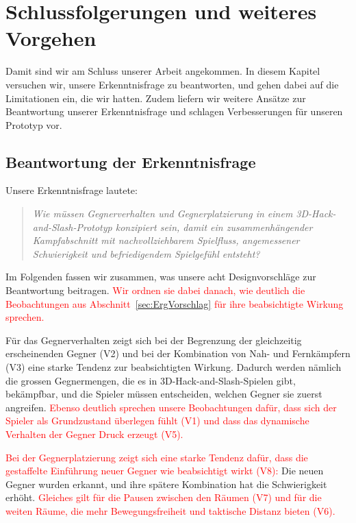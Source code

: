 \documentclass[../Main.tex]{subfiles}
\begin{document}
\section{Schlussfolgerungen und weiteres Vorgehen} \label{sec:Schlussfolgerungen}

Damit sind wir am Schluss unserer Arbeit angekommen. In diesem Kapitel versuchen wir, unsere Erkenntnisfrage zu beantworten, und gehen dabei auf die Limitationen ein, die wir hatten. Zudem liefern wir weitere Ansätze zur Beantwortung unserer Erkenntnisfrage und schlagen Verbesserungen für unseren Prototyp vor.

\subsection{Beantwortung der Erkenntnisfrage} \label{sec:Beantwortung}

Unsere Erkenntnisfrage lautete:

\begin{quote}
    \textit{Wie müssen Gegnerverhalten und Gegnerplatzierung in einem 3D-Hack-and-Slash-Prototyp konzipiert sein, damit ein zusammenhängender Kampfabschnitt mit nachvollziehbarem Spielfluss, angemessener Schwierigkeit und befriedigendem Spielgefühl entsteht?}
\end{quote}

Im Folgenden fassen wir zusammen, was unsere acht Designvorschläge zur Beantwortung beitragen. \textcolor{red}{Wir ordnen sie dabei danach, wie deutlich die Beobachtungen aus Abschnitt~\ref{sec:ErgVorschlag} für ihre beabsichtigte Wirkung sprechen.}

Für das Gegnerverhalten zeigt sich bei der Begrenzung der gleichzeitig erscheinenden Gegner (V2) und bei der Kombination von Nah- und Fernkämpfern (V3) eine starke Tendenz zur beabsichtigten Wirkung. Dadurch werden nämlich die grossen Gegnermengen, die es in 3D-Hack-and-Slash-Spielen gibt, bekämpfbar, und die Spieler müssen entscheiden, welchen Gegner sie zuerst angreifen. \textcolor{red}{Ebenso deutlich sprechen unsere Beobachtungen dafür, dass sich der Spieler als Grundzustand überlegen fühlt (V1) und dass das dynamische Verhalten der Gegner Druck erzeugt (V5).}

\textcolor{red}{Bei der Gegnerplatzierung zeigt sich eine starke Tendenz dafür, dass die gestaffelte Einführung neuer Gegner wie beabsichtigt wirkt (V8):} Die neuen Gegner wurden erkannt, und ihre spätere Kombination hat die Schwierigkeit erhöht. \textcolor{red}{Gleiches gilt für die Pausen zwischen den Räumen (V7) und für die weiten Räume, die mehr Bewegungsfreiheit und taktische Distanz bieten (V6).}
\end{document}
